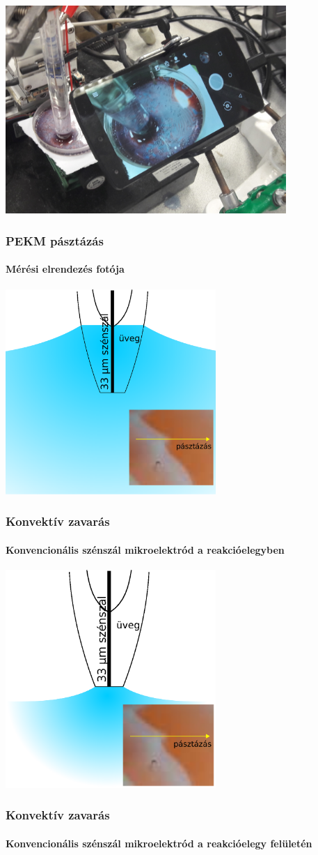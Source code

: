 \documentclass{beamer}
\begin{document}
\begin{frame}
	\centering
	\includegraphics[width=0.8\textwidth]{setup_photo.jpg}
	\frametitle{PEKM pásztázás}
	\framesubtitle{Mérési elrendezés fotója}
\end{frame}

\begin{frame}
	\centering
	\includegraphics[width=0.6\textwidth]{szigeteles1.eps}
	\frametitle{Konvektív zavarás}
	\framesubtitle{Konvencionális szénszál mikroelektród a reakcióelegyben}
\end{frame}

\begin{frame}
	\centering
	\includegraphics[width=0.6\textwidth]{szigeteles2.eps}
	\frametitle{Konvektív zavarás}
	\framesubtitle{Konvencionális szénszál mikroelektród a reakcióelegy felületén}
\end{frame}
\end{document}
